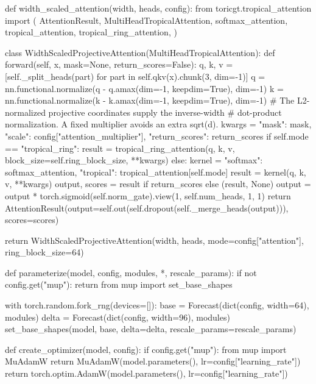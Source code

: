 \documentclass[11pt,oneside,openany]{book}
\begin{document}
\begin{BookCode}
def width_scaled_attention(width, heads, config):
    from toricgt.tropical_attention import (
        AttentionResult, MultiHeadTropicalAttention, softmax_attention,
        tropical_attention, tropical_ring_attention,
    )

    class WidthScaledProjectiveAttention(MultiHeadTropicalAttention):
        def forward(self, x, mask=None, return_scores=False):
            q, k, v = [self._split_heads(part) for part in self.qkv(x).chunk(3, dim=-1)]
            q = nn.functional.normalize(q - q.amax(dim=-1, keepdim=True), dim=-1)
            k = nn.functional.normalize(k - k.amax(dim=-1, keepdim=True), dim=-1)
            # The L2-normalized projective coordinates supply the inverse-width
            # dot-product normalization. A fixed multiplier avoids an extra sqrt(d).
            kwargs = {"mask": mask, "scale": config["attention_multiplier"],
                      "return_scores": return_scores}
            if self.mode == "tropical_ring":
                result = tropical_ring_attention(q, k, v, block_size=self.ring_block_size, **kwargs)
            else:
                kernel = {"softmax": softmax_attention, "tropical": tropical_attention}[self.mode]
                result = kernel(q, k, v, **kwargs)
            output, scores = result if return_scores else (result, None)
            output = output * torch.sigmoid(self.norm_gate).view(1, self.num_heads, 1, 1)
            return AttentionResult(output=self.out(self.dropout(self._merge_heads(output))), scores=scores)

    return WidthScaledProjectiveAttention(width, heads, mode=config["attention"], ring_block_size=64)
\end{BookCode}
\begin{BookCode}
def parameterize(model, config, modules, *, rescale_params):
    if not config.get("mup"):
        return
    from mup import set_base_shapes

    with torch.random.fork_rng(devices=[]):
        base = Forecast(dict(config, width=64), modules)
        delta = Forecast(dict(config, width=96), modules)
    set_base_shapes(model, base, delta=delta, rescale_params=rescale_params)
\end{BookCode}
\begin{BookCode}
def create_optimizer(model, config):
    if config.get("mup"):
        from mup import MuAdamW
        return MuAdamW(model.parameters(), lr=config["learning_rate"])
    return torch.optim.AdamW(model.parameters(), lr=config["learning_rate"])
\end{BookCode}
\end{document}
